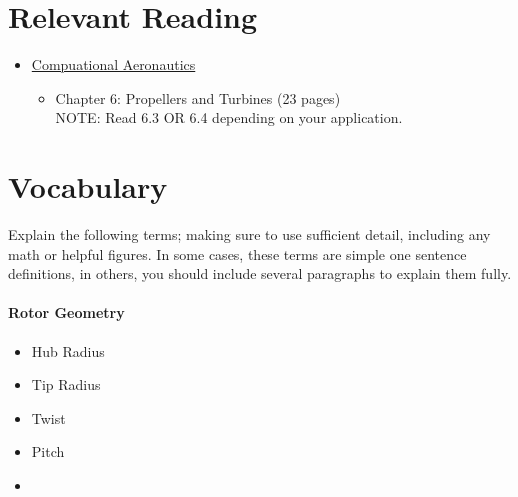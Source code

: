 \documentclass[11pt,twocolumn]{article}
\begin{document}
	
	
	
\section*{Relevant Reading}
\label{sec:reading}

\begin{itemize}
	\item \href{https://byu.box.com/shared/static/ywfayozbj3sr2ot6b32u8nqk5brqvurt.pdf}{Compuational Aeronautics}
	\begin{itemize}
		\item Chapter 6: Propellers and Turbines (23 pages) \\
		NOTE: Read 6.3 OR 6.4 depending on your application.
	\end{itemize}
\end{itemize}




\section{Vocabulary}
\label{sec:vocab}

Explain the following terms; making sure to use sufficient detail, including any math or helpful figures.
In some cases, these terms are simple one sentence definitions, in others, you should include several paragraphs to explain them fully.

\paragraph{Rotor Geometry}
\begin{itemize}
	\item Hub Radius
	\item Tip Radius
	\item Twist
	\item Pitch
	\item 
\end{itemize}
\end{document}
